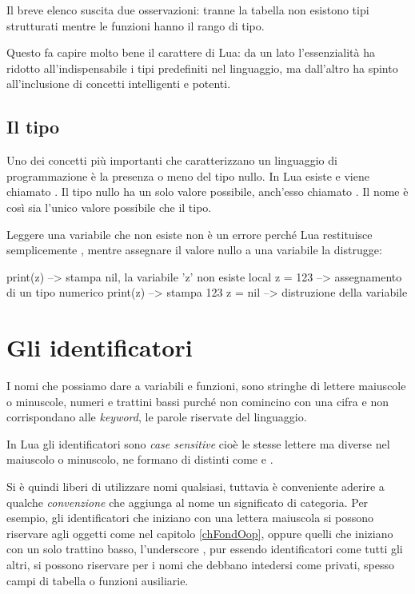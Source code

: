 Il breve elenco suscita due osservazioni: tranne la tabella non esistono
tipi strutturati mentre le funzioni hanno il rango di tipo.

Questo fa capire molto bene il carattere di Lua: da un lato l'essenzialità ha
ridotto all'indispensabile i tipi predefiniti nel linguaggio, ma dall'altro ha
spinto all'inclusione di concetti intelligenti e potenti.


\subsection{Il tipo }
\label{secFondTipoNil}

Uno dei concetti più importanti che caratterizzano un linguaggio di
programmazione è la presenza o meno del tipo nullo. In Lua esiste e viene
chiamato . Il tipo nullo ha un solo valore possibile,
anch'esso chiamato . Il nome è così sia l'unico valore possibile che il
tipo.

Leggere una variabile che non esiste non è un errore perché Lua restituisce
semplicemente , mentre assegnare il valore nullo a una variabile la
distrugge:
\begin{lines}
print(z)      --> stampa nil, la variabile 'z' non esiste
local z = 123 --> assegnamento di un tipo numerico
print(z)      --> stampa 123
z = nil       --> distruzione della variabile
\end{lines}


\section{Gli identificatori}

I nomi che possiamo dare a variabili e funzioni, sono stringhe di lettere
maiuscole o minuscole, numeri e trattini bassi \key{\_}\luas{\_} purché non
comincino con una cifra e non corrispondano alle \emph{keyword}, le parole
riservate del linguaggio.

In Lua gli identificatori sono \emph{case sensitive} cioè le stesse lettere ma
diverse nel maiuscolo o minuscolo, ne formano di distinti come  e
.

Si è quindi liberi di utilizzare nomi qualsiasi, tuttavia è conveniente aderire
a qualche \emph{convenzione} che aggiunga al nome un significato di categoria.
Per esempio, gli identificatori che iniziano con una lettera maiuscola si
possono riservare agli oggetti come nel capitolo \ref{chFondOop}, oppure quelli
che iniziano con un solo trattino basso, l'underscore \key{\_}, pur essendo
identificatori come tutti gli altri, si possono riservare per i nomi che debbano
intedersi come privati, spesso campi di tabella o funzioni ausiliarie.

